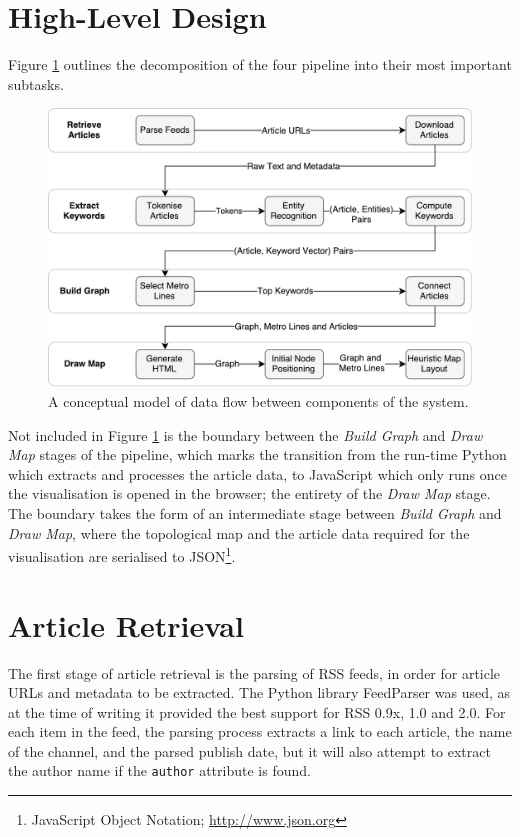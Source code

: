 \section{High-Level Design}
Figure \ref{fig:dfp} outlines the decomposition of the four pipeline into their most important subtasks.

\begin{figure}[htbp!]
	\centering
	\includegraphics[width=\textwidth]{img/design/DataFlow.pdf}
	\caption{A conceptual model of data flow between components of the system.}
	\label{fig:dfp}
\end{figure}

Not included in Figure \ref{fig:dfp} is the boundary between the \textit{Build Graph} and \textit{Draw Map} stages of the pipeline, which marks the transition from the run-time Python which extracts and processes the article data, to JavaScript which only runs once the visualisation is opened in the browser; the entirety of the  \textit{Draw Map} stage. The boundary takes the form of an intermediate stage between \textit{Build Graph} and \textit{Draw Map}, where the topological map and the article data required for the visualisation are serialised to JSON\footnote{JavaScript Object Notation; \url{http://www.json.org}}.

\section{Article Retrieval}

The first stage of article retrieval is the parsing of RSS feeds, in order for article URLs and metadata to be extracted. The Python library FeedParser was used, as at the time of writing it provided the best support for RSS 0.9x, 1.0 and 2.0. For each item in the feed, the parsing process extracts a link to each article, the name of the channel, and the parsed publish date, but it will also attempt to extract the author name if the \texttt{author} attribute is found.

